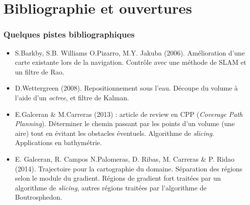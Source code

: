 \documentclass[11pt]{beamer}
\begin{document}
\section{Bibliographie et ouvertures}
\begin{frame}

\frametitle{Quelques pistes bibliographiques}

\begin{itemize}

\item S.Barkby, S.B. Williams O.Pizarro, M.Y. Jakuba
  (2006). Amélioration d'une carte existante lors de la
  navigation. Contrôle avec une méthode de SLAM et un filtre de Rao.

\item D.Wettergreen (2008). Repositionnement sous l'eau. Découpe du
  volume à l'aide d'un \textit{octree}, et filtre de Kalman.

\item E.Galceran \& M.Carreras (2013) : article de review en CPP
  (\textit{Coverage Path Planning}). Déterminer le chemin passant par
  les points d'un volume (une aire) tout en évitant les obstacles
  éventuels. Algorithme de \textit{slicing}. Applications en
  bathymétrie.

\item E. Galceran, R. Campos N.Palomeras, D. Ribas, M. Carreras \&
  P. Ridao (2014). Trajectoire pour la cartographie du
  domaine. Séparation des régions selon le module du gradient. Régions
  de gradient fort traitées par un algorithme de \textit{slicing},
  autres régions traitées par l'algorithme de Boutrosphedon.
\end{itemize}

\end{frame}
\end{document}
